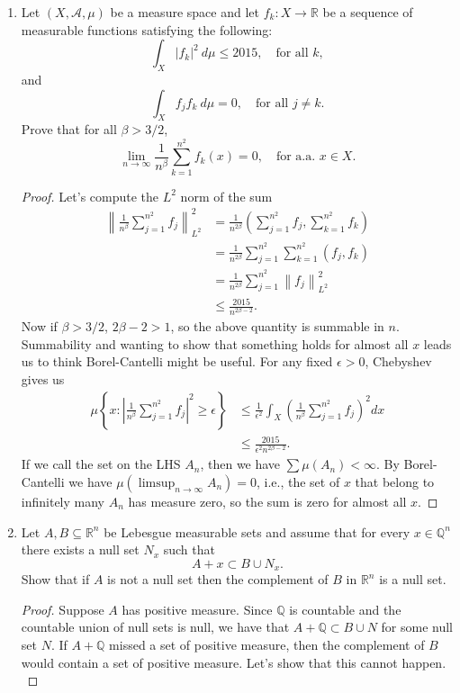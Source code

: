 \documentclass[11pt,letterpaper]{report}
\newcommand{\reals}{\mathbb{R}}
\newcommand{\mcal}[1]{\mathcal{#1}}
\newcommand{\rationals}{\mathbb{Q}}
\newcommand{\Lp}[2]{\left\|{#1}\right\|_{L^{#2}}}
\begin{document}
\begin{enumerate}
	\item Let $(X, \mcal{A}, \mu)$ be a measure space and let $f_k: X\to \reals$ be a sequence of measurable functions satisfying the following:
	\[
	\int_X |f_k|^2\ d\mu\leq 2015,\quad \text{for all }k,
	\]
	and
	\[
	\int_X f_jf_k\ d\mu=0,\quad \text{for all }j\neq k.
	\]
	Prove that for all $\beta>3/2$,
	\[
	\lim_{n\to \infty}\frac{1}{n^\beta}\sum_{k=1}^{n^2}f_k(x) = 0,\quad \text{for a.a. } x\in X.
	\]
	\begin{proof}
		Let's compute the $L^2$ norm of the sum
		\begin{align*}
			\left\|\frac{1}{n^\beta}\sum_{j=1}^{n^2}f_j\right\|_{L^2}^2 &= \frac{1}{n^{2\beta}}\left(\sum_{j=1}^{n^2}f_j, \sum_{k=1}^{n^2}f_k\right)\\
			&= \frac{1}{n^{2\beta}}\sum_{j=1}^{n^2}\sum_{k=1}^{n^2}(f_j, f_k)\\
			&= \frac{1}{n^{2\beta}}\sum_{j=1}^{n^2}\Lp{f_j}{2}^2\\
			&\leq \frac{2015}{n^{2\beta-2}}.
		\end{align*}
		Now if $\beta>3/2$, $2\beta-2>1$, so the above quantity is summable in $n$. Summability and wanting to show that something holds for almost all $x$ leads us to think Borel-Cantelli might be useful. For any fixed $\epsilon>0$, Chebyshev gives us
		\begin{align*}
			\mu\left\{x: \left|\frac{1}{n^\beta}\sum_{j=1}^{n^2}f_j\right|^2\geq\epsilon\right\} &\leq \frac{1}{\epsilon^2}\int_X \left(\frac{1}{n^\beta}\sum_{j=1}^{n^2}f_j\right)^2dx\\
			&\leq \frac{2015}{\epsilon^2n^{2\beta-2}}.
		\end{align*}
		If we call the set on the LHS $A_n$, then we have $\sum \mu(A_n)<\infty$. By Borel-Cantelli we have $\mu(\limsup_{n\to \infty}A_n) = 0$, i.e., the set of $x$ that belong to infinitely many $A_n$ has measure zero, so the sum is zero for almost all $x$.
	\end{proof}

	\item Let $A, B\subseteq \reals^n$ be Lebesgue measurable sets and assume that for every $x\in \rationals^n$ there exists a null set $N_x$ such that
	\[
	A+x\subset B\cup N_x.
	\]
	Show that if $A$ is not a null set then the complement of $B$ in $\reals^n$ is a null set.
	\begin{proof}
		Suppose $A$ has positive measure. Since $\rationals$ is countable and the countable union of null sets is null, we have that $A+\rationals \subset B \cup N$ for some null set $N$. If $A+\rationals$ missed a set of positive measure, then the complement of $B$ would contain a set of positive measure. Let's show that this cannot happen.\\


\end{proof}
\end{enumerate}
\end{document}
